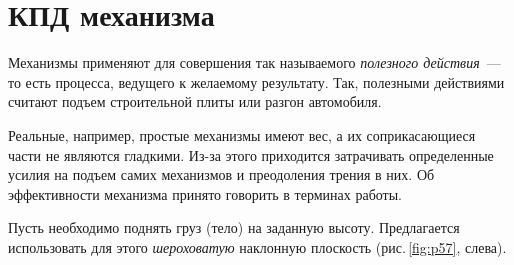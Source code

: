 \documentclass[main.tex]{subfiles}
\begin{document}

\pagestyle{empty}

 

\setcounter{section}{32
}
\addtocounter{section}{-1} 

\section{КПД механизма}

Механизмы применяют для совершения так называемого \emph{полезного действия}~--- то есть процесса, ведущего к желаемому результату. Так, полезными действиями считают подъем строительной плиты или разгон автомобиля. 

Реальные, например, простые механизмы имеют вес, а их соприкасающиеся части не являются гладкими. Из-за этого приходится затрачивать определенные усилия на подъем самих механизмов и преодоления трения в них. Об эффективности механизма принято говорить в терминах работы.

Пусть необходимо поднять груз (тело) на заданную высоту. Предлагается использовать для этого \emph{шероховатую} наклонную плоскость (рис.\,\ref{fig:p57}, слева).
\end{document}
